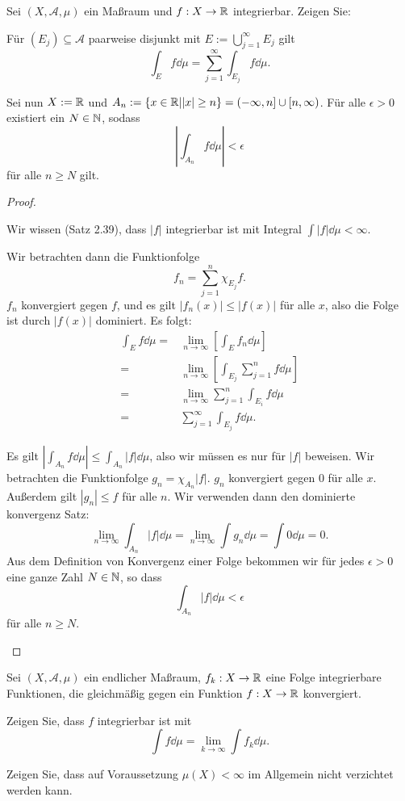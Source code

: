 \begin{Problem}
	Sei $(X,\mathcal{A},\mu)$ ein Maßraum und $f:X\to \mathbb{R}$ integrierbar. Zeigen Sie:
	\begin{parts}
		\item F\"{u}r $(E_j)\subseteq \mathcal{A}$ paarweise disjunkt mit $E:=\bigcup_{j=1}^\infty E_j$ gilt
			\[
				\int_E f\dd{\mu}=\sum_{j=1}^\infty \int_{E_j} f\dd{\mu}
			.\] 
		\item Sei nun $X:=\mathbb{R}$ und $A_n:=\left\{ x\in \mathbb{R}| |x|\ge n \right\} =(-\infty,n] \cup [n,\infty)$. F\"{u}r alle $\epsilon>0$ existiert ein $N\in \mathbb{N}$, sodass
			\[
				\left| \int_{A_n}f\dd{\mu} \right| <\epsilon
			\]
			f\"{u}r alle $n\ge N$ gilt.
	\end{parts}
\end{Problem}
\begin{proof}
	\begin{parts}
	\item Wir wissen (Satz 2.39), dass $|f|$ integrierbar ist mit Integral $\int |f|\dd{\mu}<\infty$. 

		Wir betrachten dann die Funktionfolge
		\[
			f_n=\sum_{j=1}^n \chi_{E_j}f
		.\] 
		$f_n$ konvergiert gegen $f$, und es gilt $|f_n(x)|\le |f(x)|$ f\"{u}r alle $x$, also die Folge ist durch $|f(x)|$ dominiert. Es folgt:
		\begin{align*}
			\int_E f\dd{\mu}=&\lim_{n \to \infty} \left[ \int_E f_n \dd{\mu} \right] \\
			=& \lim_{n \to \infty}\left[ \int_{E_j}\sum_{j=1}^n f\dd{\mu} \right] \\
			=&\lim_{n \to \infty} \sum_{j=1}^n\int_{E_i} f\dd{\mu}\\
			=&\sum_{j=1}^\infty \int_{E_j}f\dd{\mu}.
		\end{align*}
	\item Es gilt $\left| \int_{A_n}f\dd{\mu} \right| \le \int_{A_n}|f|\dd{\mu}$, also wir müssen es nur f\"{u}r $|f|$ beweisen. Wir betrachten die Funktionfolge $g_n=\chi_{A_n}|f|$. $g_n$ konvergiert gegen $0$ f\"{u}r alle $x$. Außerdem gilt $|g_n|\le f$ f\"{u}r alle $n$. Wir verwenden dann den dominierte konvergenz Satz:
		\[
			\lim_{n \to \infty} \int_{A_n}|f|\dd{\mu}=\lim_{n \to \infty} \int g_n\dd{\mu}=\int 0\dd{\mu}=0
		.\]
		Aus dem Definition von Konvergenz einer Folge bekommen wir f\"{u}r jedes $\epsilon>0$ eine ganze Zahl $N\in \mathbb{N}$, so dass
		\[
			\int_{A_n}|f|\dd{\mu}<\epsilon
		\]
		f\"{u}r alle $n\ge N$.\qedhere
	\end{parts}
\end{proof}
\begin{Problem}
	Sei $(X,\mathcal{A},\mu)$ ein endlicher Maßraum, $f_k:X\to \mathbb{R}$ eine Folge integrierbare Funktionen, die gleichmäßig gegen ein Funktion $f:X\to \mathbb{R}$ konvergiert.
	\begin{parts}
	\item Zeigen Sie, dass $f$ integrierbar ist mit
		\[
			\int f\dd{\mu}=\lim_{k \to \infty} \int f_k\dd{\mu}
		.\] 
	\item Zeigen Sie, dass auf Voraussetzung $\mu(X)<\infty$ im Allgemein nicht verzichtet werden kann.
	\end{parts}
\end{Problem}
